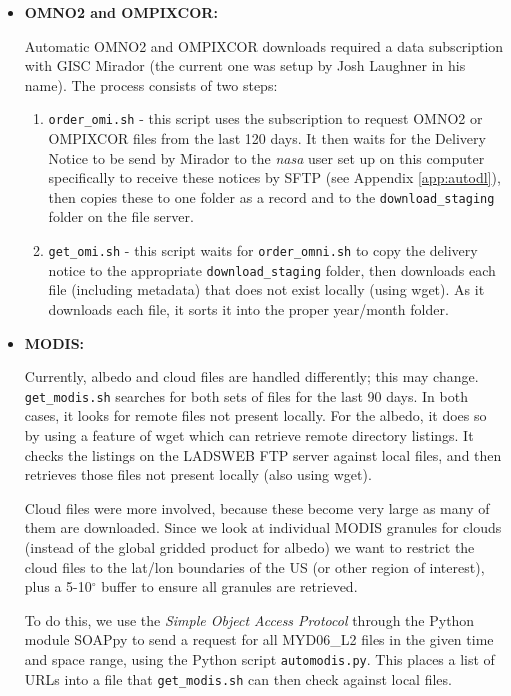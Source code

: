 \documentclass[12pt]{article}
\begin{document}
		\begin{itemize}
			\item \textbf{OMNO2 and OMPIXCOR:}
			
			Automatic OMNO2 and OMPIXCOR downloads required a data subscription with GISC Mirador (the current one was setup by Josh Laughner in his name). The process consists of two steps:
			\begin{enumerate} [noitemsep]
				\item \texttt{order\_omi.sh} - this script uses the subscription to request OMNO2 or OMPIXCOR files from the last 120 days. It then waits for the Delivery Notice to be send by Mirador to the \emph{nasa} user set up on this computer specifically to receive these notices by SFTP (see Appendix \ref{app:autodl}), then copies these to one folder as a record and to the \texttt{download\_staging} folder on the file server.
				
				\item \texttt{get\_omi.sh} - this script waits for \texttt{order\_omni.sh} to copy the delivery notice to the appropriate \texttt{download\_staging} folder, then downloads each file (including metadata) that does not exist locally (using wget). As it downloads each file, it sorts it into the proper year/month folder.
			\end{enumerate}
			
			\item \textbf{MODIS:}
			
			Currently, albedo and cloud files are handled differently; this may change. \texttt{get\_modis.sh} searches for both sets of files for the last 90 days. In both cases, it looks for remote files not present locally. For the albedo, it does so by using a feature of wget which can retrieve remote directory listings. It checks the listings on the LADSWEB FTP server against local files, and then retrieves those files not present locally (also using wget).
			
			Cloud files were more involved, because these become very large as many of them are downloaded. Since we look at individual MODIS granules for clouds (instead of the global gridded product for albedo) we want to restrict the cloud files to the lat/lon boundaries of the US (or other region of interest), plus a 5-10$^\circ$ buffer to ensure all granules are retrieved.
			
			To do this, we use the \emph{Simple Object Access Protocol} through the Python module SOAPpy to send a request for all MYD06\_L2 files in the given time and space range, using the Python script \texttt{automodis.py}. This places a list of URLs into a file that \texttt{get\_modis.sh} can then check against local files. 
			

\end{itemize}
\end{document}
